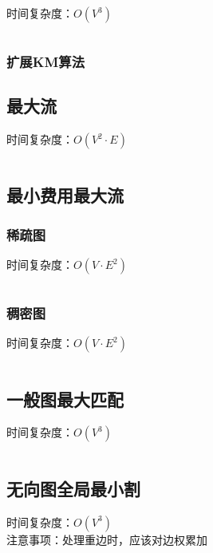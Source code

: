 \documentclass[a4paper]{article}
\newcommand{\cppcode}[1]{
    \inputminted[mathescape]{cpp}{source/#1}
}
\begin{document}
时间复杂度：$O(V^3)$

\cppcode{graph-theory/maximum-weight-matching.cpp}

\subsubsection{扩展KM算法}

\subsection{最大流}

时间复杂度：$O(V^2 \cdot E)$

\cppcode{graph-theory/maximum-flow.cpp}

\subsection{最小费用最大流}

\subsubsection{稀疏图}

时间复杂度：$O(V \cdot E^2)$

\cppcode{graph-theory/minimum-cost-flow-spfa.cpp}

\subsubsection{稠密图}

时间复杂度：$O(V \cdot E^2)$

\cppcode{graph-theory/minimum-cost-flow-zkw.cpp}

\subsection{一般图最大匹配}

时间复杂度：$O(V^3)$

\cppcode{graph-theory/maximum-matching-blossom.cpp}

\subsection{无向图全局最小割}

时间复杂度：$O(V^3)$\\
\indent 注意事项：处理重边时，应该对边权累加

\cppcode{graph-theory/minimum-cut-stoer-wagner.cpp}
\end{document}
